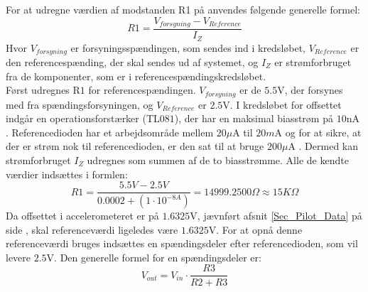 \noindent For at udregne værdien af modstanden R1 på  anvendes følgende generelle formel:
\begin{equation}\label{eq:udregning_modstand}
R1 = \dfrac{V_{forsyning} - V_{Reference}}{I_{Z}}
\end{equation}
\noindent Hvor $V_{forsyning}$ er forsyningsspændingen, som sendes ind i kredsløbet, $V_{Reference}$ er den referencespænding, der skal sendes ud af systemet, og $I_{Z}$ er strømforbruget fra de komponenter, som er i referencespændingskredsløbet. \\
Først udregnes R$1$ for referencespændingen. $V_{forsyning}$ er de $5.5$V, der forsynes med fra spændingsforsyningen, og $V_{Reference}$ er $2.5$V. I kredsløbet for offsettet indgår en operationsforstærker (TL$081$), der har en maksimal biasstrøm på $10$nA \cite{Corporation1995}. Referencedioden har et arbejdsområde mellem $20\mu$A til $20m$A og for at sikre, at der er strøm nok til referencedioden, er den sat til at bruge $200\mu$A \cite{Instruments2005}. Dermed kan strømforbruget $I_{Z}$ udregnes som summen af de to biasstrømme. Alle de kendte værdier indsættes i formlen:
\begin{equation}
R1 = \frac{5.5V - 2.5V}{0.0002 + (1 \cdot 10^{-8A})} = 14999.2500\Omega \approx 15K\Omega
\end{equation}  
Da offsettet i accelerometeret er på $1.6325$V, jævnført afsnit \ref{Sec_Pilot_Data} på side \pageref{Sec_Pilot_Data}, skal referenceværdi ligeledes være $1.6325$V. For at opnå denne referenceværdi bruges indsættes en spændingsdeler efter referencedioden, som vil levere $2.5$V. Den generelle formel for en spændingsdeler er: 
\begin{equation} \label{eq:Spaendingsdeler}
V_{out} = V_{in} \cdot \dfrac{R3}{R2 + R3}
\end{equation}

